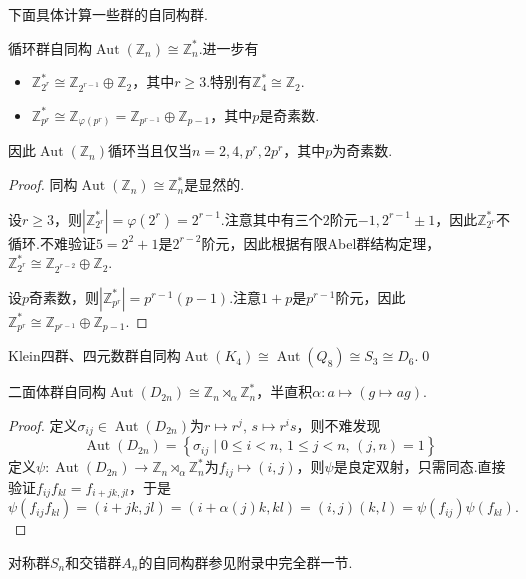 下面具体计算一些群的自同构群.
\begin{prop}
	循环群自同构$\operatorname*{Aut}(\mathbb{Z}_n)\cong\mathbb{Z}_n^*$.进一步有
	\begin{itemize}
		\item $\mathbb{Z}_{2^r}^*\cong\mathbb{Z}_{2^{r-1}}\oplus\mathbb{Z}_2$，其中$r\ge 3$.特别有$\mathbb{Z}_4^*\cong\mathbb{Z}_2$.
		\item $\mathbb{Z}_{p^r}^*\cong\mathbb{Z}_{\varphi(p^r)}=\mathbb{Z}_{p^{r-1}}\oplus\mathbb{Z}_{p-1}$，其中$p$是奇素数.
	\end{itemize}
	因此$\operatorname*{Aut}(\mathbb{Z}_n)$循环当且仅当$n=2,4,p^r,2p^r$，其中$p$为奇素数.\hypertarget{prop:CyclicAuto}{}
\end{prop}
\begin{proof}
	同构$\operatorname*{Aut}(\mathbb{Z}_n)\cong\mathbb{Z}_n^*$是显然的.

	设$r\ge 3$，则$|\mathbb{Z}_{2^r}^*|=\varphi(2^r)=2^{r-1}$.注意其中有三个$2$阶元$-1,2^{r-1}\pm 1$，因此$\mathbb{Z}_{2^r}^*$不循环.不难验证$5=2^2+1$是$2^{r-2}$阶元，因此根据有限Abel群结构定理，$\mathbb{Z}_{2^r}^*\cong\mathbb{Z}_{2^{r-2}}\oplus\mathbb{Z}_2$.

	设$p$奇素数，则$|\mathbb{Z}_{p^r}^*|=p^{r-1}(p-1)$.注意$1+p$是$p^{r-1}$阶元，因此$\mathbb{Z}_{p^r}^*\cong\mathbb{Z}_{p^{r-1}}\oplus\mathbb{Z}_{p-1}$.
\end{proof}
\begin{prop}
	Klein四群、四元数群自同构$\operatorname*{Aut}(K_4)\cong\operatorname*{Aut}(Q_8)\cong S_3\cong D_6$.\qed
\end{prop}
\begin{prop}
	二面体群自同构$\operatorname*{Aut}(D_{2n})\cong\mathbb{Z}_n\rtimes_\alpha\mathbb{Z}_n^*$，半直积$\alpha\colon a\mapsto(g\mapsto ag)$.
\end{prop}
\begin{proof}
	定义$\sigma_{ij}\in\operatorname*{Aut}(D_{2n})$为$r\mapsto r^j,\,s\mapsto r^is$，则不难发现
	\[
		\operatorname*{Aut}(D_{2n})=\left\{\sigma_{ij}\mid 0\le i<n,\,1\le j<n,\,(j,n)=1\right\}
	\]
	定义$\psi\colon\operatorname*{Aut}(D_{2n})\to\mathbb{Z}_n\rtimes_\alpha\mathbb{Z}_n^*$为$f_{ij}\mapsto(i,j)$，则$\psi$是良定双射，只需同态.直接验证$f_{ij}f_{kl}=f_{i+jk,jl}$，于是
	\[
		\psi(f_{ij}f_{kl})=(i+jk,jl)=(i+\alpha(j)k,kl)=(i,j)(k,l)=\psi(f_{ij})\psi(f_{kl}).
	\]
\end{proof}

对称群$S_n$和交错群$A_n$的自同构群参见附录中完全群一节.%

